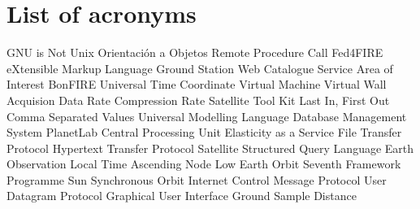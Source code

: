 \chapter{List of acronyms}

{\small
\begin{acronym}[XXXXXXXX]
       {\acs{GNU} is Not Unix}
        {Orientación a Objetos}
       {Remote Procedure Call}
       {Fed4FIRE}
      {eXtensible Markup Language}
      {Ground Station}
      {Web Catalogue Service}
     {Area of Interest}
      {BonFIRE}
    {Universal Time Coordinate}
     {Virtual Machine}
     {Virtual Wall}
    {Acquision Data Rate}
     {Compression Rate}
    {Satellite Tool Kit}
   {Last In, First Out}
    {Comma Separated Values}
    {Universal Modelling Language}
   {Database Management System}
     {PlanetLab}
    {Central Processing Unit}
   {Elasticity as a Service}
    {File Transfer Protocol}
   {Hypertext Transfer Protocol}
    {Satellite}
    {Structured Query Language}
  {Earth Observation}
  {Local Time Ascending Node}
  {Low Earth Orbit}
 {Seventh Framework Programme}
 {Sun Synchronous Orbit}
 {Internet Control Message Protocol}
 {User Datagram Protocol}
 {Graphical User Interface}
 {Ground Sample Distance}
\end{acronym}
}




